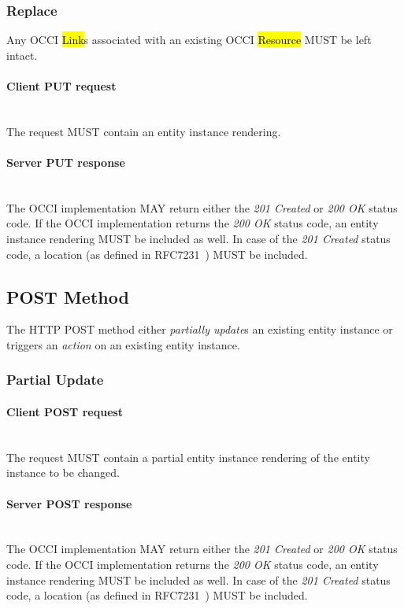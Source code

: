 \documentclass[10pt,a4paper]{article}
\begin{document}
\subsubsection{Replace}
Any OCCI \hl{Link}s associated with an existing OCCI \hl{Resource} MUST be left intact.

\paragraph*{Client PUT request}\hfill\\
The request MUST contain an entity instance rendering.

\paragraph*{Server PUT response}\hfill\\
The OCCI implementation MAY return either the \emph{201 Created} or \emph{200 OK} status code. If the OCCI implementation
returns the \emph{200 OK} status code, an entity instance rendering MUST be included as well.
In case of the \emph{201 Created} status code, a location (as defined in RFC7231~\cite{rfc7231}) MUST be included.

\subsection{POST Method}
The HTTP POST method either {\em partially update}s an existing entity instance or triggers
an {\em action} on an existing entity instance.

\subsubsection{Partial Update}

\paragraph*{Client POST request}\hfill\\
The request MUST contain a partial entity instance rendering of the entity instance to be changed.

\paragraph*{Server POST response}\hfill\\
The OCCI implementation MAY return either the \emph{201 Created} or \emph{200 OK} status code. If the OCCI implementation
returns the \emph{200 OK} status code, an entity instance rendering MUST be included as well.
In case of the \emph{201 Created} status code, a location (as defined in RFC7231~\cite{rfc7231}) MUST be included.
\end{document}
